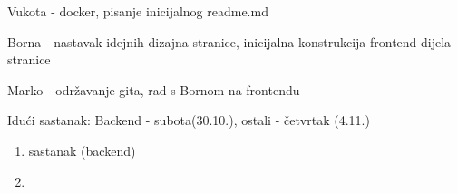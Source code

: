 \begin{packed_enum}
\begin{packed_item}
\begin{packed_item}
                    \item Vukota - docker, pisanje inicijalnog readme.md
                    \item Borna - nastavak idejnih dizajna stranice, inicijalna konstrukcija frontend dijela stranice
                    \item Marko - održavanje gita, rad s Bornom na frontendu
               \end{packed_item}
               \item Idući sastanak: Backend - subota(30.10.), ostali - četvrtak (4.11.)
            \end{packed_item}
            
            \bigskip
            \begin{enumerate}
            \noindent \item[\mylabel{itm41}{4.1.}]  sastanak (backend)
            \item[] 
            \end{enumerate}
            

\end{packed_enum}
